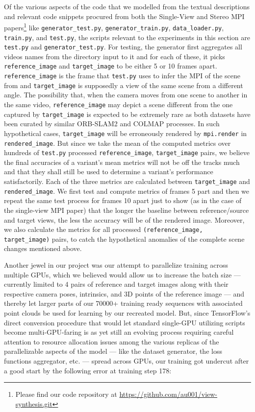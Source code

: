 Of the various aspects of the code that we modelled from the textual descriptions and relevant code snippets procured from both the Single-View and Stereo MPI papers\footnote{Please find our code repository at \url{https://github.com/au001/view-synthesis.git}} like \texttt{generator\_test.py}, \texttt{generator\_train.py}, \texttt{data\_loader.py}, \texttt{train.py}, and \texttt{test.py}, the scripts relevant to the experiments in this section are \texttt{test.py} and \texttt{generator\_test.py}. For testing, the generator first aggregates all videos names from the directory input to it and for each of these, it picks \texttt{reference\_image} and \texttt{target\_image} to be either 5 or 10 frames apart. \texttt{reference\_image} is the frame that \texttt{test.py} uses to infer the MPI of the scene from and \texttt{target\_image} is supposedly a view of the same scene from a different angle. The possibility that, when the camera moves from one scene to another in the same video, \texttt{reference\_image} may depict a scene different from the one captured by \texttt{target\_image} is expected to be extremely rare as both datasets have been curated by similar ORB-SLAM2 and COLMAP processes. In such hypothetical cases, \texttt{target\_image} will be erroneously rendered by \texttt{mpi.render} in \texttt{rendered\_image}. But since we take the mean of the computed metrics over hundreds of \texttt{test.py} processed \texttt{reference\_image}, \texttt{target\_image} pairs, we believe the final accuracies of a variant's mean metrics will not be off the tracks much and that they shall still be used to determine a variant’s performance satisfactorily. Each of the three metrics are calculated between \texttt{target\_image} and \texttt{rendered\_image}. We first test and compute metrics of frames 5 part and then we repeat the same test process for frames 10 apart just to show (as in the case of the single-view MPI paper) that the longer the baseline between reference/source and target views, the less the accuracy will be of the rendered image. Moreover, we also calculate the metrics for all processed \texttt{(reference\_image, target\_image)} pairs, to catch the hypothetical anomalies of the complete scene changes mentioned above. 

Another jewel in our project was our attempt to parallelize training across multiple GPUs, which we believed would allow us to increase the batch size --- currently limited to 4 pairs of reference and target images along with their respective camera poses, intrinsics, and 3D points of the reference image --- and thereby let larger parts of our 70000+ training ready sequences with associated point clouds be used for learning by our recreated model. But, since TensorFlow's direct conversion procedure that would let standard single-GPU utilizing scripts become multi-GPU-faring is as yet still an evolving process requiring careful attention to resource allocation issues among the various replicas of the parallelizable aspects of the model --- like the dataset generator, the loss functions aggregator, etc. --- spread across GPUs, our training got undercut after a good start by the following error at training step 178: 

